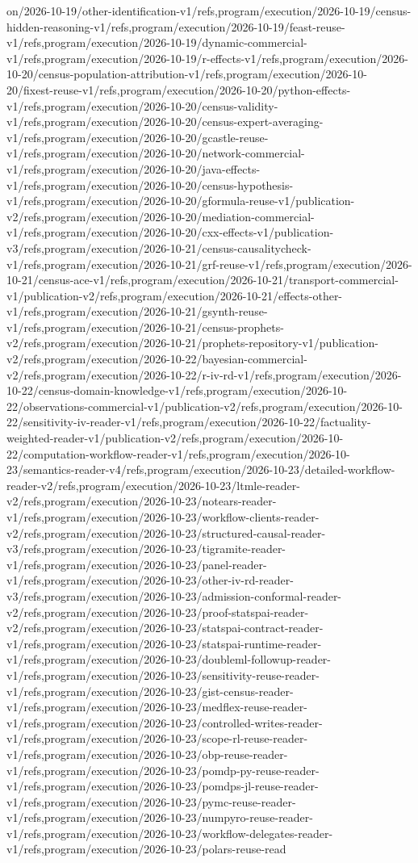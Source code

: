 \documentclass[11pt,a4paper,openany]{book}
\begin{document}
on/2026-10-19/other-identification-v1/refs,program/execution/2026-10-19/census-hidden-reasoning-v1/refs,program/execution/2026-10-19/feast-reuse-v1/refs,program/execution/2026-10-19/dynamic-commercial-v1/refs,program/execution/2026-10-19/r-effects-v1/refs,program/execution/2026-10-20/census-population-attribution-v1/refs,program/execution/2026-10-20/fixest-reuse-v1/refs,program/execution/2026-10-20/python-effects-v1/refs,program/execution/2026-10-20/census-validity-v1/refs,program/execution/2026-10-20/census-expert-averaging-v1/refs,program/execution/2026-10-20/gcastle-reuse-v1/refs,program/execution/2026-10-20/network-commercial-v1/refs,program/execution/2026-10-20/java-effects-v1/refs,program/execution/2026-10-20/census-hypothesis-v1/refs,program/execution/2026-10-20/gformula-reuse-v1/publication-v2/refs,program/execution/2026-10-20/mediation-commercial-v1/refs,program/execution/2026-10-20/cxx-effects-v1/publication-v3/refs,program/execution/2026-10-21/census-causalitycheck-v1/refs,program/execution/2026-10-21/grf-reuse-v1/refs,program/execution/2026-10-21/census-ace-v1/refs,program/execution/2026-10-21/transport-commercial-v1/publication-v2/refs,program/execution/2026-10-21/effects-other-v1/refs,program/execution/2026-10-21/gsynth-reuse-v1/refs,program/execution/2026-10-21/census-prophets-v2/refs,program/execution/2026-10-21/prophets-repository-v1/publication-v2/refs,program/execution/2026-10-22/bayesian-commercial-v2/refs,program/execution/2026-10-22/r-iv-rd-v1/refs,program/execution/2026-10-22/census-domain-knowledge-v1/refs,program/execution/2026-10-22/observations-commercial-v1/publication-v2/refs,program/execution/2026-10-22/sensitivity-iv-reader-v1/refs,program/execution/2026-10-22/factuality-weighted-reader-v1/publication-v2/refs,program/execution/2026-10-22/computation-workflow-reader-v1/refs,program/execution/2026-10-23/semantics-reader-v4/refs,program/execution/2026-10-23/detailed-workflow-reader-v2/refs,program/execution/2026-10-23/ltmle-reader-v2/refs,program/execution/2026-10-23/notears-reader-v1/refs,program/execution/2026-10-23/workflow-clients-reader-v2/refs,program/execution/2026-10-23/structured-causal-reader-v3/refs,program/execution/2026-10-23/tigramite-reader-v1/refs,program/execution/2026-10-23/panel-reader-v1/refs,program/execution/2026-10-23/other-iv-rd-reader-v3/refs,program/execution/2026-10-23/admission-conformal-reader-v2/refs,program/execution/2026-10-23/proof-statspai-reader-v2/refs,program/execution/2026-10-23/statspai-contract-reader-v1/refs,program/execution/2026-10-23/statspai-runtime-reader-v1/refs,program/execution/2026-10-23/doubleml-followup-reader-v1/refs,program/execution/2026-10-23/sensitivity-reuse-reader-v1/refs,program/execution/2026-10-23/gist-census-reader-v1/refs,program/execution/2026-10-23/medflex-reuse-reader-v1/refs,program/execution/2026-10-23/controlled-writes-reader-v1/refs,program/execution/2026-10-23/scope-rl-reuse-reader-v1/refs,program/execution/2026-10-23/obp-reuse-reader-v1/refs,program/execution/2026-10-23/pomdp-py-reuse-reader-v1/refs,program/execution/2026-10-23/pomdps-jl-reuse-reader-v1/refs,program/execution/2026-10-23/pymc-reuse-reader-v1/refs,program/execution/2026-10-23/numpyro-reuse-reader-v1/refs,program/execution/2026-10-23/workflow-delegates-reader-v1/refs,program/execution/2026-10-23/polars-reuse-read
\end{document}
